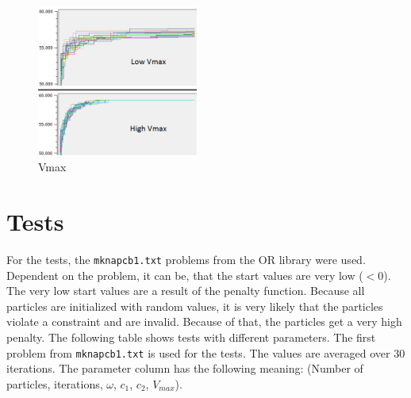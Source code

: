 \documentclass{article}
\begin{document}
\begin{figure}[H]
    \centering
    \includegraphics[width=200px]{images/vmax.PNG}
    \caption{Vmax}
    \label{fig-vmax}
\end{figure}

\section{Tests}
\label{lbl-tests}
For the tests, the \lstinline$mknapcb1.txt$ problems from the OR library were used.  Dependent on the problem, it can be, that the start values are very low ($< 0$). The very low start values are a result of the penalty function. Because all particles are initialized with random values, it is very likely that the particles violate a constraint and are invalid. Because of that, the particles get a very high penalty. The following table shows tests with different parameters. The first problem from \lstinline$mknapcb1.txt$ is used for the tests. The values are averaged over 30 iterations. The parameter column has the following meaning: (Number of particles, iterations, $\omega$, $c_1$, $c_2$, $V_{max}$). \\
\end{document}
